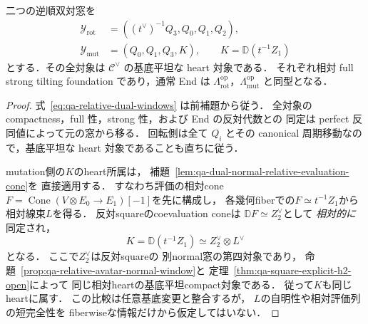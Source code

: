 \begin{proposition}[二つの反対窓は同じ双対heartに入る]
\label{prop:qa-relative-rot-mut-dual-windows}
二つの逆順双対窓を
\[
 \begin{split}
 \mathcal Y_{\mathrm{rot}}
   &=((t^\vee)^{-1}Q_3,Q_0,Q_1,Q_2),\\
 \mathcal Y_{\mathrm{mut}}
   &=(Q_0,Q_1,Q_3,K),\qquad K=\mathbb D(t^{-1}Z_1)
 \end{split}
 \tag{DW}\label{eq:qa-relative-dual-windows}
\]
とする．その全対象は $\mathcal C^\vee$ の基底平坦な heart 対象である．
それぞれ相対 full strong tilting foundation であり，通常 End は
$\Lambda_{\mathrm{rot}}^{\mathrm{op}}$，$\Lambda_{\mathrm{mut}}^{\mathrm{op}}$ と同型となる．
\end{proposition}
\begin{proof}
式~\eqref{eq:qa-relative-dual-windows} は前補題から従う．
全対象の compactness，full 性，strong 性，および End の反対代数との
同定は perfect 反同値によって元の窓から移る．
回転側は全て $Q_i$ とその canonical 周期移動なので，基底平坦な
heart 対象であることも直ちに従う．

mutation側の$K$のheart所属は，
補題~\ref{lem:qa-dual-normal-relative-evaluation-cone}を
直接適用する．
すなわち評価の相対cone
$F=\operatorname{Cone}
(V\otimes E_0\to E_1)[-1]$を先に構成し，
各幾何fiberでの$F\simeq t^{-1}Z_1$から
相対線束$L$を得る．
反対squareのcoevaluation coneは
$\mathbb DF\simeq Z_2^\vee$として
\emph{相対的に}同定され，
\[
 K=\mathbb D(t^{-1}Z_1)
   \simeq Z_2^\vee\otimes L^\vee
\]
となる．
ここで$Z_2^\vee$は反対squareの
別normal窓の第四対象であり，
命題~\ref{prop:qa-relative-avatar-normal-window}と
定理~\ref{thm:qa-square-explicit-h2-open}によって
同じ相対heartの基底平坦compact対象である．
従って$K$も同じheartに属す．
この比較は任意基底変更と整合するが，
$L$の自明性や相対評価列の短完全性を
fiberwiseな情報だけから仮定してはいない．
\end{proof}

